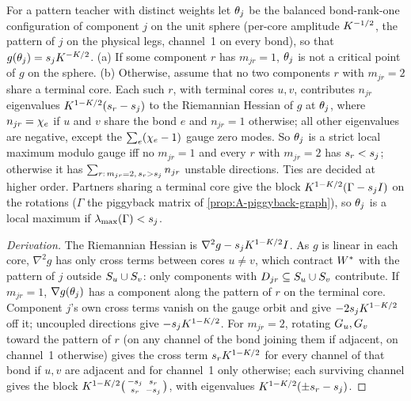\begin{proposition}\label{prop:A-component-hessian}
  \derived{} \newresult[for general trees; for binary $\Ns=4$ the unstable direction toward the top
  component is \citealp{jacot2022saddletosaddle}, Lemma~15; strict and non-strict critical points of the
  loss: \citealp{achour2024loss}]
  For a pattern teacher with distinct weights let $\theta_j$ be the balanced bond-rank-one configuration of
  component $j$ on the unit sphere (per-core amplitude $K^{-1/2}$, the pattern of $j$ on the physical legs,
  channel~1 on every bond), so that $g(\theta_j)=s_{j}K^{-K/2}$. (a) If some component $r$ has $m_{jr}=1$,
  $\theta_j$ is not a critical point of $g$ on the sphere. (b) Otherwise, assume that no two components $r$
  with $m_{jr}=2$ share a terminal core. Each such $r$, with terminal cores $u,v$, contributes $n_{jr}$
  eigenvalues $K^{1-K/2}(s_{r}-s_{j})$ to the Riemannian Hessian of $g$ at $\theta_j$, where $n_{jr}=\chi_{e}$ if
  $u$ and $v$ share the bond $e$ and $n_{jr}=1$ otherwise; all other eigenvalues are negative, except the
  $\sum_e(\chi_{e}-1)$ gauge zero modes. So $\theta_j$ is a strict local maximum modulo gauge iff no $m_{jr}=1$ and
  every $r$ with $m_{jr}=2$ has $s_{r}<s_{j}$; otherwise it has $\sum_{r:\,m_{jr}=2,\,s_{r}>s_{j}}n_{jr}$ unstable
  directions. Ties are decided at higher order. Partners sharing a terminal core give the block
  $K^{1-K/2}(\Gamma-s_{j}I)$ on the rotations ($\Gamma$ the piggyback matrix of \cref{prop:A-piggyback-graph}), so
  $\theta_j$ is a local maximum if $\lambda_{\max}(\Gamma)<s_{j}$.
\end{proposition}
\begin{proof}[Derivation]
  The Riemannian Hessian is $\nabla^2g-s_{j}K^{1-K/2}I$. As $g$ is linear in each core, $\nabla^2g$ has only
  cross terms between cores $u\ne v$, which contract $W^{*}$ with the pattern of $j$ outside $S_{u}\cup S_{v}$:
  only components with $D_{jr}\subseteq S_{u}\cup S_{v}$ contribute. If $m_{jr}=1$, $\nabla g(\theta_j)$ has a
  component along the pattern of $r$ on the terminal core. Component $j$'s own cross terms vanish on the
  gauge orbit and give $-2s_{j}K^{1-K/2}$ off it; uncoupled directions give $-s_{j}K^{1-K/2}$. For $m_{jr}=2$,
  rotating $G_{u},G_{v}$ toward the pattern of $r$ (on any channel of the bond joining them if adjacent, on
  channel~1 otherwise) gives the cross term $s_{r}K^{1-K/2}$ for every channel of that bond if $u,v$ are
  adjacent and for channel~1 only otherwise; each surviving channel gives the block
  $K^{1-K/2}\big(\begin{smallmatrix}-s_{j}&s_{r}\\ s_{r}&-s_{j}\end{smallmatrix}\big)$, with eigenvalues $K^{1-K/2}(\pm s_{r}-s_{j})$.
\end{proof}
